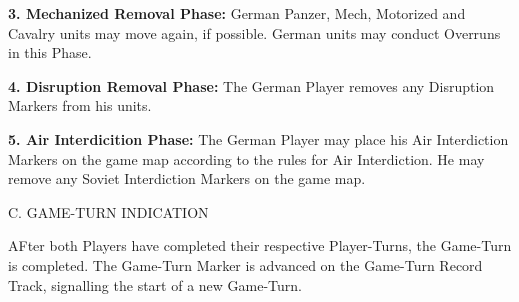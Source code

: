 \textbf{3. Mechanized Removal Phase:} German Panzer, Mech, Motorized and Cavalry units may move again, if possible. German units may conduct Overruns in this Phase.

\textbf{4. Disruption Removal Phase:} The German Player removes any Disruption Markers from his units.

\textbf{5. Air Interdicition Phase:} The German Player may place his Air Interdiction Markers on the game map according to the rules for Air Interdiction. He may remove any Soviet Interdiction Markers on the game map.

C. GAME-TURN INDICATION

AFter both Players have completed their respective Player-Turns, the Game-Turn is completed. The Game-Turn Marker is advanced on the Game-Turn Record Track, signalling the start of a new Game-Turn.